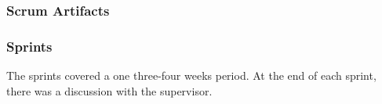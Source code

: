 \documentclass{scrartcl}
\begin{document}
  		\subsubsection{Scrum Artifacts }
  		
  		\subsubsection{Sprints}
  		
	The sprints covered a one three-four weeks period. At the end of each sprint, there was a discussion with the supervisor.
%
%
%
%
%
%
% 
%
%
%
%
%
% 
\end{document}
